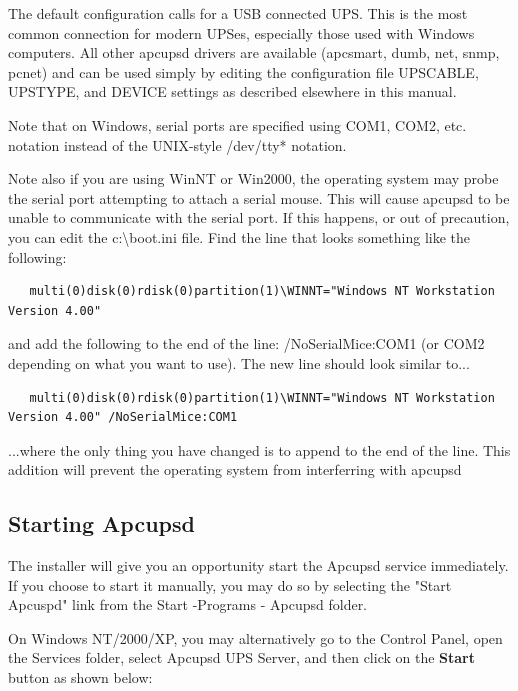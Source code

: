 {{{{{{{The default configuration calls for a USB connected UPS. This is the most
common connection for modern UPSes, especially those used with Windows
computers. All other apcupsd drivers are available (apcsmart, dumb, net,
snmp, pcnet) and can be used simply by editing the configuration file
UPSCABLE, UPSTYPE, and DEVICE settings as described elsewhere in this 
manual.

Note that on Windows, serial ports are specified using COM1, COM2, etc.
notation instead of the UNIX-style /dev/tty* notation.

Note also if you are using WinNT or Win2000, the operating system may 
probe the serial port attempting to attach a serial mouse. This will cause
apcupsd to be unable to communicate with the serial port. 
If this happens, or out of precaution, you can edit the c:\textbackslash{}boot.ini
file. Find the line that looks something like the following:  

\begin{verbatim}
   multi(0)disk(0)rdisk(0)partition(1)\WINNT="Windows NT Workstation Version 4.00"
\end{verbatim}

and add the following to the end of the line: /NoSerialMice:COM1 (or COM2
depending on what you want to use). The new line should look similar to...

\begin{verbatim}
   multi(0)disk(0)rdisk(0)partition(1)\WINNT="Windows NT Workstation Version 4.00" /NoSerialMice:COM1  
\end{verbatim}

...where the only thing you have changed is to append to the end of the line.
This addition will prevent the operating system from interferring with apcupsd


\label{Starting Apcupsd}
\subsection*{Starting Apcupsd}

The installer will give you an opportunity start the Apcupsd service
immediately. If you choose to start it manually, you may do so by selecting
the "Start Apcuspd" link from the Start -\gt{}Programs -\gt{} Apcupsd folder.

On Windows NT/2000/XP, you may alternatively go to the Control Panel, open
the Services folder, select Apcupsd UPS Server, and then click on the
{\bf Start} button as shown below:

}}}}}}}
